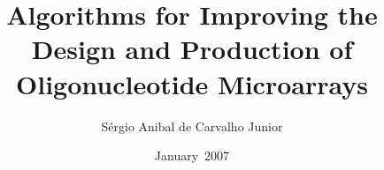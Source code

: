 \documentclass[12pt,pagesize,a4paper,BCOR1cm,DIV13,headsepline,cleardoubleplain,chapterprefix,halfparskip,pointlessnumbers,tablecaptionabove]{scrbook}
\newcommand{\handindate}{January~2007}
\begin{document}
\selectlanguage{\american}
\frontmatter\pagestyle{plain}

\title{Algorithms for Improving the Design and Production of
  Oligonucleotide Microarrays}
\author{S\'ergio Anibal de Carvalho Junior}
\date{\handindate}
\publishers{\large{PhD thesis submitted to the\\
  Faculty of Technology of Bielefeld University, Germany,\\
  for the degree of Dr.~rer.~nat.\\
  ~\\
  Supervisor:\\
  Dr.~Sven Rahmann\\
  }}
\lowertitleback{
  1. Referee: Prof.~Dr.~Jens~Stoye\\
  2. Referee: Dr.~Sven~Rahmann\\[2ex]
  }
\maketitle[-1]

\clearpage
\setcounter{tocdepth}{1}



\tableofcontents
\clearpage\pagestyle{headings}
\mainmatter















%
\end{document}
